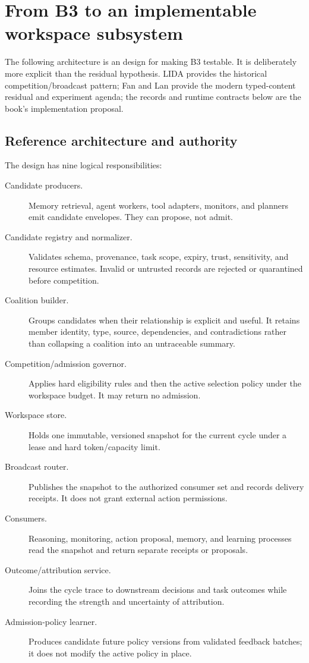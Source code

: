 \section{From B3 to an implementable workspace subsystem}
\label{sec:ch14-implementation}

The following architecture is an \EngineeringLabel{} design for making B3 testable. It is deliberately more explicit than the residual hypothesis. LIDA provides the historical competition/broadcast pattern; Fan and Lan provide the modern typed-content residual and experiment agenda; the records and runtime contracts below are the book's implementation proposal.

\subsection{Reference architecture and authority}

The design has nine logical responsibilities:
\begin{description}
  \item[Candidate producers.] Memory retrieval, agent workers, tool adapters, monitors, and planners emit candidate envelopes. They can propose, not admit.
  \item[Candidate registry and normalizer.] Validates schema, provenance, task scope, expiry, trust, sensitivity, and resource estimates. Invalid or untrusted records are rejected or quarantined before competition.
  \item[Coalition builder.] Groups candidates when their relationship is explicit and useful. It retains member identity, type, source, dependencies, and contradictions rather than collapsing a coalition into an untraceable summary.
  \item[Competition/admission governor.] Applies hard eligibility rules and then the active selection policy under the workspace budget. It may return no admission.
  \item[Workspace store.] Holds one immutable, versioned snapshot for the current cycle under a lease and hard token/capacity limit.
  \item[Broadcast router.] Publishes the snapshot to the authorized consumer set and records delivery receipts. It does not grant external action permissions.
  \item[Consumers.] Reasoning, monitoring, action proposal, memory, and learning processes read the snapshot and return separate receipts or proposals.
  \item[Outcome/attribution service.] Joins the cycle trace to downstream decisions and task outcomes while recording the strength and uncertainty of attribution.
  \item[Admission-policy learner.] Produces candidate future policy versions from validated feedback batches; it does not modify the active policy in place.
\end{description}

